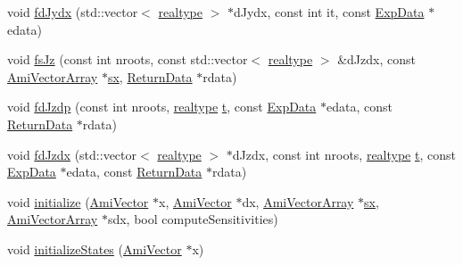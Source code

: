 \begin{DoxyCompactItemize}
\item 
void \mbox{\hyperlink{classamici_1_1_model_ac99eae87bbdddda688f7190610958b0e}{fd\+Jydx}} (std\+::vector$<$ \mbox{\hyperlink{namespaceamici_a1bdce28051d6a53868f7ccbf5f2c14a3}{realtype}} $>$ $\ast$d\+Jydx, const int it, const \mbox{\hyperlink{classamici_1_1_exp_data}{Exp\+Data}} $\ast$edata)
\item 
void \mbox{\hyperlink{classamici_1_1_model_a244bed76a2775b92cfbbb347ec65a54f}{fs\+Jz}} (const int nroots, const std\+::vector$<$ \mbox{\hyperlink{namespaceamici_a1bdce28051d6a53868f7ccbf5f2c14a3}{realtype}} $>$ \&d\+Jzdx, const \mbox{\hyperlink{classamici_1_1_ami_vector_array}{Ami\+Vector\+Array}} $\ast$\mbox{\hyperlink{classamici_1_1_model_ac3288cc7f649605938f1fd1b459d3d8c}{sx}}, \mbox{\hyperlink{classamici_1_1_return_data}{Return\+Data}} $\ast$rdata)
\item 
void \mbox{\hyperlink{classamici_1_1_model_a86a7134f894b152a68f904b22cee04d1}{fd\+Jzdp}} (const int nroots, \mbox{\hyperlink{namespaceamici_a1bdce28051d6a53868f7ccbf5f2c14a3}{realtype}} \mbox{\hyperlink{classamici_1_1_model_a711281d57e9710226face29151cc4641}{t}}, const \mbox{\hyperlink{classamici_1_1_exp_data}{Exp\+Data}} $\ast$edata, const \mbox{\hyperlink{classamici_1_1_return_data}{Return\+Data}} $\ast$rdata)
\item 
void \mbox{\hyperlink{classamici_1_1_model_a588e7cb4790ce3b77700a3acef1c43fc}{fd\+Jzdx}} (std\+::vector$<$ \mbox{\hyperlink{namespaceamici_a1bdce28051d6a53868f7ccbf5f2c14a3}{realtype}} $>$ $\ast$d\+Jzdx, const int nroots, \mbox{\hyperlink{namespaceamici_a1bdce28051d6a53868f7ccbf5f2c14a3}{realtype}} \mbox{\hyperlink{classamici_1_1_model_a711281d57e9710226face29151cc4641}{t}}, const \mbox{\hyperlink{classamici_1_1_exp_data}{Exp\+Data}} $\ast$edata, const \mbox{\hyperlink{classamici_1_1_return_data}{Return\+Data}} $\ast$rdata)
\item 
void \mbox{\hyperlink{classamici_1_1_model_ac49b8bcfed2798f9220180e038ae7354}{initialize}} (\mbox{\hyperlink{classamici_1_1_ami_vector}{Ami\+Vector}} $\ast$x, \mbox{\hyperlink{classamici_1_1_ami_vector}{Ami\+Vector}} $\ast$dx, \mbox{\hyperlink{classamici_1_1_ami_vector_array}{Ami\+Vector\+Array}} $\ast$\mbox{\hyperlink{classamici_1_1_model_ac3288cc7f649605938f1fd1b459d3d8c}{sx}}, \mbox{\hyperlink{classamici_1_1_ami_vector_array}{Ami\+Vector\+Array}} $\ast$sdx, bool compute\+Sensitivities)
\item 
void \mbox{\hyperlink{classamici_1_1_model_a73d147a7108479e20833ba816cac0f6b}{initialize\+States}} (\mbox{\hyperlink{classamici_1_1_ami_vector}{Ami\+Vector}} $\ast$x)

\end{DoxyCompactItemize}
